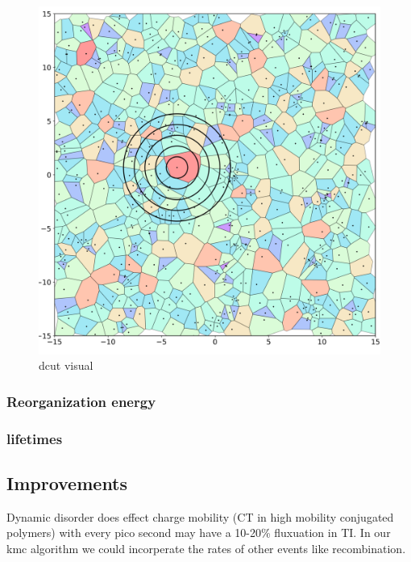 \begin{figure}
  \center
  \includegraphics[width=\linewidth, height=\textheight,keepaspectratio]{figures/crystalline_voronoi_d_cut_circles.png} 
  \caption{dcut visual}
  \label{fig:dcut}
\end{figure}
\subsubsection{Reorganization energy}
\subsubsection{lifetimes}

\subsection{Improvements}
Dynamic disorder does effect charge mobility (CT in high mobility conjugated polymers) with every pico second
may have a 10-20\% fluxuation in TI. 
In our kmc algorithm we could incorperate the rates of other events like recombination.
